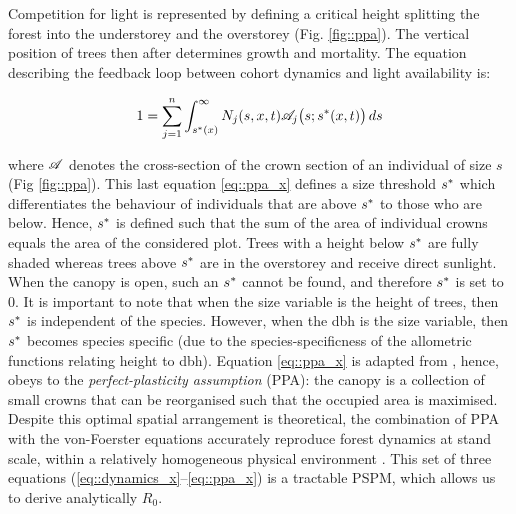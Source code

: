 Competition for light is represented by defining a critical height splitting
the forest into the understorey and the overstorey (Fig. \ref{fig::ppa}). The
vertical position of trees then after determines growth and mortality. The
equation describing the feedback loop between cohort dynamics and light
availability is:

\begin{equation}
	1 = \sum_{j = 1}^{n} \int_{{s}^{*}(x)}^{\infty} N_j(s, x, t) \mathscr{A}_j \big(s; {s}^{*}(x, t)\big) \, ds \label{eq::ppa_x}
\end{equation}

\noindent where $ \mathscr{A} $ denotes the cross-section of the crown section of an individual of size $ s $ (Fig \ref{fig::ppa}). This
last equation \eqref{eq::ppa_x} defines a size threshold $ {s}^{*} $ which
differentiates the behaviour of individuals that are above $ {s}^{*} $ to those who
are below. Hence, $ {s}^{*} $ is defined such that the sum of the area of
individual crowns equals the area of the considered plot. Trees with a height
below $ {s}^{*} $ are fully shaded whereas trees above $ {s}^{*} $ are in the overstorey
and receive direct sunlight. When the canopy is open, such an $ {s}^{*} $ cannot be found, and therefore $ {s}^{*} $ is set to $ 0 $. It is important to note that when the size variable is the height of trees, then $ {s}^{*} $ is independent of the species. However, when the dbh is the size variable, then $ {s}^{*} $ becomes species specific (due to the species-specificness of the allometric functions relating height to dbh). Equation \eqref{eq::ppa_x} is adapted from \citet{Strigul2008}, hence, obeys to the
\textit{perfect-plasticity assumption} (PPA): the canopy is a collection of
small crowns that can be reorganised such that the occupied area is maximised.
Despite this optimal spatial arrangement is theoretical, the combination of
PPA with the von-Foerster equations accurately reproduce forest dynamics at
stand scale, within a relatively homogeneous physical environment
\citep{Strigul2008, Purves2008}. This set of three equations
(\ref{eq::dynamics_x}--\ref{eq::ppa_x}) is a tractable PSPM, which allows us to derive analytically $ R_0 $.

